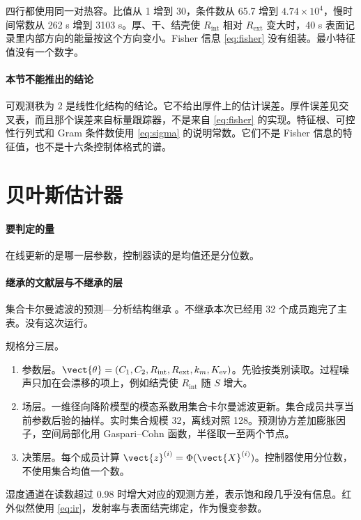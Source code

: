 四行都使用同一对热容。比值从 1 增到 30，条件数从 65.7 增到 \(4.74\times 10^{4}\)，慢时间常数从 262 s 增到 3103 s。厚、干、结壳使 \(R_{\mathrm{int}}\) 相对 \(R_{\mathrm{ext}}\) 变大时，40 s 表面记录里内部方向的能量按这个方向变小。Fisher 信息 \eqref{eq:fisher} 没有组装。最小特征值没有一个数字。

\paragraph{本节不能推出的结论}
可观测秩为 2 是线性化结构的结论。它不给出厚件上的估计误差。厚件误差见交叉表，而且那个误差来自标量跟踪器，不是来自 \eqref{eq:fisher} 的实现。特征根、可控性行列式和 Gram 条件数使用 \eqref{eq:sigma} 的说明常数。它们不是 Fisher 信息的特征值，也不是十六条控制体格式的谱。

\section{贝叶斯估计器}

\paragraph{要判定的量}
在线更新的是哪一层参数，控制器读的是均值还是分位数。

\paragraph{继承的文献层与不继承的层}
集合卡尔曼滤波的预测—分析结构继承 \cite{evensen2003}。不继承本次已经用 32 个成员跑完了主表。没有这次运行。

规格分三层。

\begin{enumerate}
\item 参数层。\(\vect{\theta}=(C_1,C_2,R_{\mathrm{int}},R_{\mathrm{ext}},k_m,K_{\mathrm{ev}})\)。先验按类别读取。过程噪声只加在会漂移的项上，例如结壳使 \(R_{\mathrm{int}}\) 随 \(S\) 增大。
\item 场层。一维径向降阶模型的模态系数用集合卡尔曼滤波更新。集合成员共享当前参数后验的抽样。实时集合规模 32，离线对照 128。预测协方差加膨胀因子，空间局部化用 Gaspari--Cohn 函数，半径取一至两个节点。
\item 决策层。每个成员计算 \(\vect{z}^{(i)}=\Phi(\vect{X}^{(i)})\)。控制器使用分位数，不使用集合均值一个数。
\end{enumerate}

湿度通道在读数超过 0.98 时增大对应的观测方差，表示饱和段几乎没有信息。红外似然使用 \eqref{eq:ir}，发射率与表面结壳绑定，作为慢变参数。

